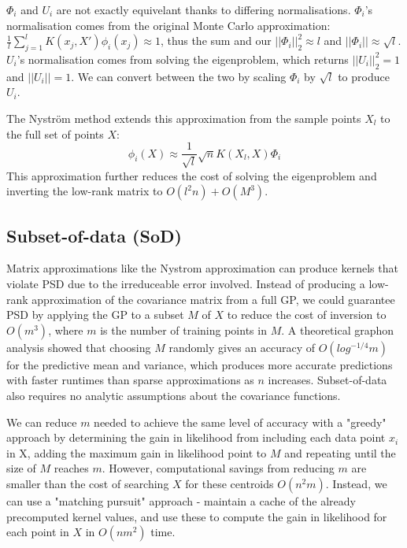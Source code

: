 $\Phi_i$ and $U_i$ are not exactly equivelant thanks to differing normalisations. $\Phi_i$'s normalisation comes from the original Monte Carlo approximation: $\frac{1}{l} \sum_{j=1}^{l} K(x_j, X') \phi_i(x_j) \approx 1$, thus the sum and our $||\Phi_i||_2^2 \approx l$ and $||\Phi_i|| \approx \sqrt{l}$. $U_i$'s normalisation comes from solving the eigenproblem, which returns $||U_i||_2^2 = 1$ and $||U_i|| = 1$. We can convert between the two by scaling $\Phi_i$ by $\sqrt{l}$ to produce $U_i$.

The Nyström method \cite{nystrom} extends this approximation from the sample points $X_l$ to the full set of points $X$:
\begin{equation*}
    \phi_i(X) \approx \frac{1}{\sqrt{l}} \sqrt{n} K(X_l, X) \Phi_i
\end{equation*}
This approximation further reduces the cost of solving the eigenproblem and inverting the low-rank matrix to $O(l^2 n) + O(M^3)$.


\subsection{Subset-of-data (SoD) \cite{big-data}}
Matrix approximations like the Nystrom approximation can produce kernels that violate PSD due to the irreduceable error involved. Instead of producing a low-rank approximation of the covariance matrix from a full GP, we could guarantee PSD by applying the GP to a subset $M$ of $X$ to reduce the cost of inversion to $O(m^3)$, where $m$ is the number of training points in $M$. A theoretical graphon analysis showed that choosing $M$ randomly gives an accuracy of $O(log^{-1/4}m)$ for the predictive mean and variance, which produces more accurate predictions with faster runtimes than sparse approximations as $n$ increases. \cite{random-subsampling} Subset-of-data also requires no analytic assumptions about the covariance functions.


We can reduce $m$ needed to achieve the same level of accuracy with a "greedy" approach by determining the gain in likelihood from including each data point $x_i$ in X, adding the maximum gain in likelihood point to $M$ and repeating until the size of $M$ reaches $m$. However, computational savings from reducing $m$ are smaller than the cost of searching $X$ for these centroids $O(n^2m)$. Instead, we can use a "matching pursuit" approach - maintain a cache of the already precomputed kernel values, and use these to compute the gain in likelihood for each point in $X$ in $O(nm^2)$ time. \cite{matching-pursuit}


